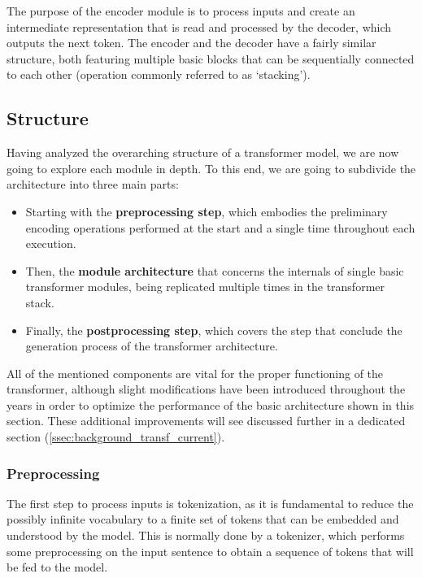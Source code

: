 The purpose of the encoder module is to process inputs and create an intermediate representation that is read and processed by the decoder, which outputs the next token.
The encoder and the decoder have a fairly similar structure, both featuring multiple basic blocks that can be sequentially connected to each other (operation commonly referred to as `stacking').

\subsection{Structure}\label{ssec:background_transf_structure}

Having analyzed the overarching structure of a transformer model, we are now going to explore each module in depth.
To this end, we are going to subdivide the architecture into three main parts:
\begin{itemize}
    \item Starting with the \textbf{preprocessing step}, which embodies the preliminary encoding operations performed at the start and a single time throughout each execution.
    \item Then, the \textbf{module architecture} that concerns the internals of single basic transformer modules, being replicated multiple times in the transformer stack.
    \item Finally, the \textbf{postprocessing step}, which covers the step that conclude the generation process of the transformer architecture.
\end{itemize}

All of the mentioned components are vital for the proper functioning of the transformer, although slight modifications have been introduced throughout the years in order to optimize the performance of the basic architecture shown in this section.
These additional improvements will see discussed further in a dedicated section (\cref{ssec:background_transf_current}).

\subsubsection*{Preprocessing}

The first step to process inputs is tokenization, as it is fundamental to reduce the possibly infinite vocabulary to a finite set of tokens that can be embedded and understood by the model.
This is normally done by a tokenizer, which performs some preprocessing on the input sentence to obtain a sequence of tokens that will be fed to the model.

